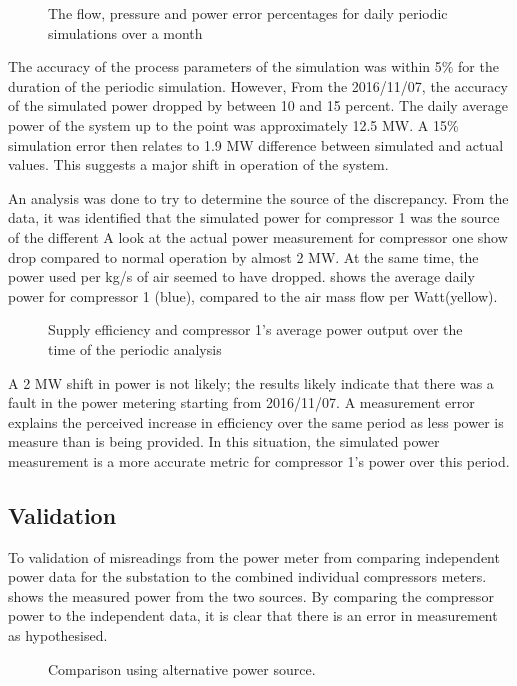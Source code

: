 	\begin{figure}[h!]
		\centering
		
		\caption{The flow, pressure and power error percentages for daily periodic simulations over a month}
		\label{fig: Periodic simulation}
	\end{figure} 
The accuracy of the process parameters of the simulation was within 5\% for the duration of the periodic simulation. However, From the 2016/11/07, the accuracy of the simulated power dropped by between 10 and 15 percent.  The daily average power of the system up to the point was approximately 12.5 MW. A 15\% simulation error then relates to 1.9 MW difference between simulated and actual values. This suggests a major shift in operation of the system.
\par 
An analysis was done to try to determine the source of the discrepancy. From the data, it was identified that the simulated power for compressor 1 was the source of the different A look at the actual power measurement for compressor one show drop compared to normal operation by almost 2 MW. At the same time, the power used per kg/s of air seemed to have dropped.  shows the average daily power for compressor 1 (blue), compared to the air mass flow per Watt(yellow). 
\par
	\begin{figure}[h!]
		\centering
		
		\caption{Supply efficiency and compressor 1's average power output over the time of the periodic analysis}
		\label{fig: MeasurementAccuracy.}
	\end{figure} 

A 2 MW shift in power is not likely; the results likely indicate that there was a fault in the power metering starting from 2016/11/07. A measurement error explains the perceived increase in efficiency over the same period as less power is measure than is being provided.  In this situation, the simulated power measurement is a more accurate metric for compressor 1’s power over this period.
 \subsection{Validation}
To validation of misreadings from the power meter from comparing independent power data for the substation to the combined individual compressors meters. shows the measured power from the two sources. By comparing the compressor power to the independent data, it is clear that there is an error in measurement as hypothesised.
	\begin{figure}[h!]
		\centering
		
		\caption{Comparison using alternative power source.}
		\label{fig: Corrected Periodic simulation}
	\end{figure} 
	
